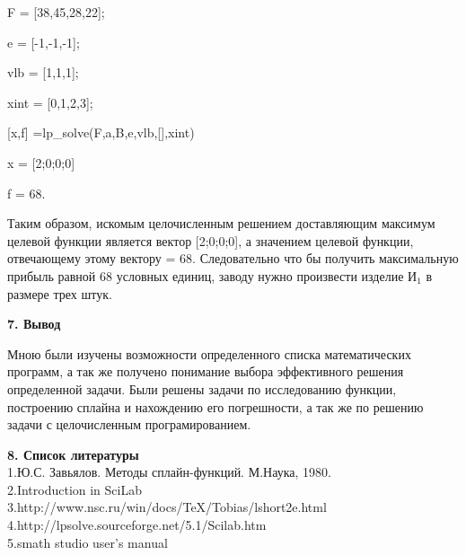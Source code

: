 \documentclass[russian,utf8,nocolumxxxi,nocolumnxxxii]{eskdtext}
\begin{document}
F = [38,45,28,22]; 

e = [-1,-1,-1]; 

vlb = [1,1,1]; 

xint = [0,1,2,3]; 

[x,f] =lp\_solve(F,a,B,e,vlb,[],xint) 

x = [2;0;0;0] 

f = 68. 

Таким образом, искомым целочисленным решением доставляющим максимум целевой функции является вектор [2;0;0;0], а значением целевой функции, отвечающему этому вектору = 68. Следовательно что бы получить максимальную прибыль равной 68 условных единиц, заводу нужно произвести изделие И$_1$ в размере трех штук.

\newpage
\begin{center} {\bf7. Вывод} \end{center}
Мною были изучены возможности определенного списка математических программ, а так же получено понимание выбора эффективного решения определенной задачи. Были решены задачи по исследованию функции, построению сплайна и нахождению его погрешности, а так же по решению задачи с целочисленным програмированием.



\newpage
{\bf8. Список литературы}
\\1.Ю.С. Завьялов. Методы сплайн-функций. М.Наука, 1980.
\\2.Introduction in SciLab
\\3.http://www.nsc.ru/win/docs/TeX/Tobias/lshort2e.html
\\4.http://lpsolve.sourceforge.net/5.1/Scilab.htm
\\5.smath studio user’s manual
\end{document}
